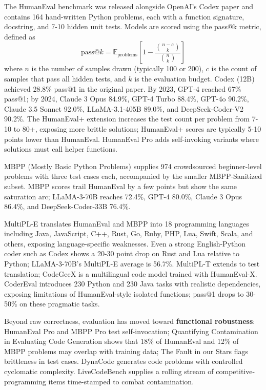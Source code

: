 \documentclass{article}
\begin{document}
The HumanEval benchmark \cite{chen20212021} was released alongside OpenAI's Codex paper and contains 164 hand-written Python problems, each with a function signature, docstring, and 7-10 hidden unit tests. Models are scored using the pass@k metric, defined as
\[\text{pass@}k = \mathbb{E}_{\text{problems}}\left[1 - \frac{\binom{n - c}{k}}{\binom{n}{k}}\right]\]
where \(n\) is the number of samples drawn (typically 100 or 200), \(c\) is the count of samples that pass all hidden tests, and \(k\) is the evaluation budget. Codex (12B) achieved 28.8\% pass@1 in the original paper. By 2023, GPT-4 reached 67\% pass@1; by 2024, Claude 3 Opus 84.9\%, GPT-4 Turbo 88.4\%, GPT-4o 90.2\%, Claude 3.5 Sonnet 92.0\%, LLaMA-3.1-405B 89.0\%, and DeepSeek-Coder-V2 90.2\%. The HumanEval+ extension \citep{liu2023gevalnlgevaluation} increases the test count per problem from 7-10 to 80+, exposing more brittle solutions; HumanEval+ scores are typically 5-10 points lower than HumanEval. HumanEval Pro \cite{yu20242024} adds self-invoking variants where solutions must call helper functions.

MBPP (Mostly Basic Python Problems) \cite{austin20212021} supplies 974 crowdsourced beginner-level problems with three test cases each, accompanied by the smaller MBPP-Sanitized subset. MBPP scores trail HumanEval by a few points but show the same saturation arc; LLaMA-3-70B reaches 72.4\%, GPT-4 80.0\%, Claude 3 Opus 86.4\%, and DeepSeek-Coder-33B 76.4\%.

MultiPL-E \cite{cassano20232023} translates HumanEval and MBPP into 18 programming languages including Java, JavaScript, C++, Rust, Go, Ruby, PHP, Lua, Swift, Scala, and others, exposing language-specific weaknesses. Even a strong English-Python coder such as Codex shows a 20-30 point drop on Rust and Lua relative to Python; LLaMA-3-70B's MultiPL-E average is 56.7\%. MultiPL-T extends to test translation; CodeGeeX \cite{zheng20232023} is a multilingual code model trained with HumanEval-X. CoderEval \cite{yu20242024} introduces 230 Python and 230 Java tasks with realistic dependencies, exposing limitations of HumanEval-style isolated functions; pass@1 drops to 30-50\% on these pragmatic tasks.

Beyond raw correctness, evaluation has moved toward \textbf{functional robustness}: HumanEval Pro and MBPP Pro \cite{yu20242024} test self-invocation; Quantifying Contamination in Evaluating Code Generation \cite{riddell2024quantifyingcontami} shows that 18\% of HumanEval and 12\% of MBPP problems may overlap with training data; The Fault in our Stars \cite{siddiq20242024} flags brittleness in test cases. DynaCode \cite{hu20252025} generates code problems with controlled cyclomatic complexity. LiveCodeBench supplies a rolling stream of competitive-programming items time-stamped to combat contamination.
\end{document}

